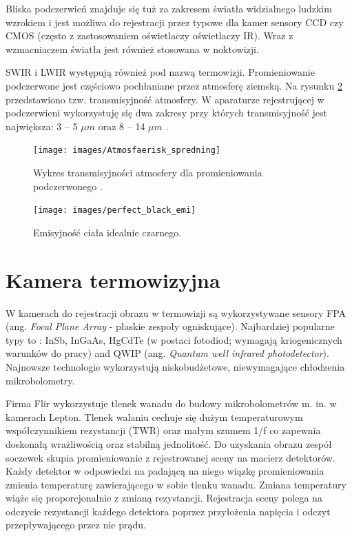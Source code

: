 Bliska podczerwień znajduje się tuż za zakresem światła widzialnego ludzkim wzrokiem i jest możliwa do rejestracji przez typowe dla kamer sensory CCD czy CMOS (często z zastosowaniem oświetlaczy oświetlaczy IR). Wraz z wzmacniaczem światła jest również stosowana w noktowizji.

SWIR i LWIR występują również pod nazwą termowizji. Promieniowanie podczerwone jest częściowo pochłaniane przez atmosferę ziemską. Na rysunku \ref{fig:atmosfera_int} przedstawiono tzw. transmisyjność atmosfery. W aparaturze rejestrującej w podczerwieni wykorzystuję się dwa zakresy przy których transmisyjność jest największa: 3 -- 5 $\mu m$ oraz 8 -- 14 $\mu m$ 
\cite{niklaus2007mems}. 

\begin{figure}
\centering
\texttt{[image: images/Atmosfaerisk\_spredning]}
\caption[Wykres transmisyjności atmosfery dla promieniowania podczerwonego ]{Wykres transmisyjności atmosfery dla promieniowania podczerwonego \cite{wiki:infrared}.}
\label{fig:perfect_black}
\end{figure}

\begin{figure}
\centering
\texttt{[image: images/perfect\_black\_emi]}
\caption[Emisyjność ciała idealnie czarnego]{Emisyjność ciała idealnie czarnego.}
\label{fig:atmosfera_int}
\end{figure}


\section{Kamera termowizyjna}

W kamerach do rejestracji obrazu w termowizji są wykorzystywane sensory FPA (ang. \textit{Focal Plane Array}  - płaskie zespoły ogniskujące). Najbardziej popularne typy to : InSb, InGaAs, HgCdTe (w postaci fotodiod; wymagają kriogenicznych warunków do pracy) and QWIP (ang. \textit{ Quantum well infrared photodetector}). Najnowsze technologie wykorzystują niskobudżetowe, niewymagające chłodzenia mikrobolometry. 

Firma Flir wykorzystuje tlenek wanadu do budowy mikrobolometrów m. in. w kamerach Lepton. Tlenek walaniu cechuje się dużym temperaturowym współczynnikiem rezystancji (TWR) oraz małym szumem 1/f co zapewnia doskonałą wrażliwością oraz stabilną jednolitość. Do uzyskania obrazu zespół soczewek skupia promieniowanie z rejestrowanej sceny na macierz detektorów. Każdy detektor w odpowiedzi na padającą na niego wiązkę promieniowania zmienia temperaturę zawierającego w sobie tlenku wanadu. Zmiana temperatury wiąże się proporcjonalnie z zmianą rezystancji. Rejestracja sceny polega na odczycie rezystancji każdego detektora poprzez przyłożenia napięcia i odczyt przepływającego przez nie prądu. \cite{flir:lepton} 

